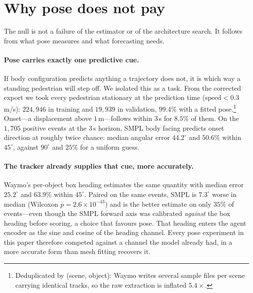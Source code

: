 \documentclass{article} %
\begin{document}
\section{Why pose does not pay}
\label{sec:why}

The null is not a failure of the estimator or of the architecture search. It
follows from what pose measures and what forecasting needs.

\paragraph{Pose carries exactly one predictive cue.}
If body configuration predicts anything a trajectory does not, it is which way a
standing pedestrian will step off. We isolated this as a task. From the corrected
export we took every pedestrian stationary at the prediction time
($\text{speed}<0.3$\,m/s): $224{,}946$ in training and $19{,}939$ in validation,
$99.4\%$ with a fitted pose.\footnote{Deduplicated by (scene, object): Waymo writes
several sample files per scene carrying identical tracks, so the raw extraction is
inflated $5.4\times$.} Onset---a displacement above $1$\,m---follows within $3$\,s
for $8.5\%$ of them. On the $1{,}705$ positive events at the $3$\,s horizon, SMPL
body facing predicts onset direction at roughly twice chance: median angular error
$44.2^\circ$ and $50.6\%$ within $45^\circ$, against $90^\circ$ and $25\%$ for a
uniform guess.

\paragraph{The tracker already supplies that cue, more accurately.}
Waymo's per-object box heading estimates the same quantity with median error
$25.2^\circ$ and $63.9\%$ within $45^\circ$. Paired on the same events, SMPL is
$7.3^\circ$ worse in median (Wilcoxon $p{=}2.6\times10^{-43}$) and is the better
estimate on only $35\%$ of events---even though the SMPL forward axis was
calibrated \emph{against} the box heading before scoring, a choice that favours
pose. That heading enters the agent encoder as the sine and cosine of the heading
channel. Every pose experiment in this paper therefore competed against a channel
the model already had, in a more accurate form than mesh fitting recovers it.
\end{document}
